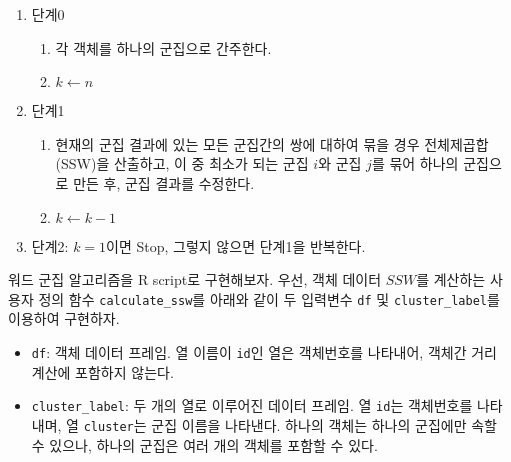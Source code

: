 \documentclass[]{book}
\providecommand{\tightlist}{%
  \setlength{\itemsep}{0pt}\setlength{\parskip}{0pt}}
\begin{document}
\begin{enumerate}
\def\labelenumi{\arabic{enumi}.}
\tightlist
\item
  단계0

  \begin{enumerate}
  \def\labelenumii{\arabic{enumii}.}
  \tightlist
  \item
    각 객체를 하나의 군집으로 간주한다.
  \item
    \(k \leftarrow n\)
  \end{enumerate}
\item
  단계1

  \begin{enumerate}
  \def\labelenumii{\arabic{enumii}.}
  \tightlist
  \item
    현재의 군집 결과에 있는 모든 군집간의 쌍에 대하여 묶을 경우 전체제곱합(SSW)을 산출하고, 이 중 최소가 되는 군집 \(i\)와 군집 \(j\)를 묶어 하나의 군집으로 만든 후, 군집 결과를 수정한다.
  \item
    \(k \leftarrow k - 1\)
  \end{enumerate}
\item
  단계2: \(k = 1\)이면 Stop, 그렇지 않으면 단계1을 반복한다.
\end{enumerate}

워드 군집 알고리즘을 R script로 구현해보자. 우선, 객체 데이터 \(SSW\)를 계산하는 사용자 정의 함수 \texttt{calculate\_ssw}를 아래와 같이 두 입력변수 \texttt{df} 및 \texttt{cluster\_label}를 이용하여 구현하자.

\begin{itemize}
\tightlist
\item
  \texttt{df}: 객체 데이터 프레임. 열 이름이 \texttt{id}인 열은 객체번호를 나타내어, 객체간 거리 계산에 포함하지 않는다.
\item
  \texttt{cluster\_label}: 두 개의 열로 이루어진 데이터 프레임. 열 \texttt{id}는 객체번호를 나타내며, 열 \texttt{cluster}는 군집 이름을 나타낸다. 하나의 객체는 하나의 군집에만 속할 수 있으나, 하나의 군집은 여러 개의 객체를 포함할 수 있다.
\end{itemize}
\end{document}
